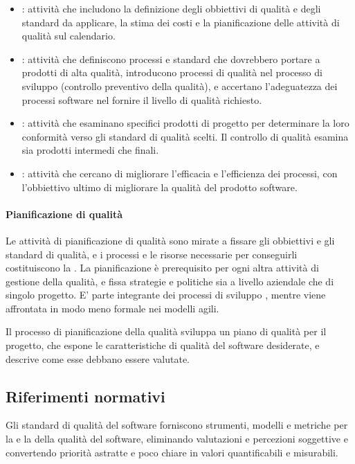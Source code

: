 \begin{itemize}
	\item {}: attività che includono la definizione degli obbiettivi di qualità e degli standard da applicare, la stima dei costi e la pianificazione delle attività di qualità sul calendario.
	\item {}: attività che definiscono processi e standard che dovrebbero portare a prodotti di alta qualità, introducono processi di qualità nel processo di sviluppo (controllo preventivo della qualità), e accertano l'adeguatezza dei processi software nel fornire il livello di qualità richiesto.
	\item {}: attività che esaminano specifici prodotti di progetto per determinare la loro conformità verso gli standard di qualità scelti. Il controllo di qualità esamina sia prodotti intermedi che finali.
	\item {}: attività che cercano di migliorare l'efficacia e l'efficienza dei processi, con l'obbiettivo ultimo di migliorare la qualità del prodotto software.
\end{itemize}

\paragraph{Pianificazione di qualità}
Le attività di pianificazione di qualità sono mirate a fissare gli obbiettivi e gli standard di qualità, e i processi e le risorse necessarie per conseguirli costituiscono la . La pianificazione è prerequisito per ogni altra attività di gestione della qualità, e fissa strategie e politiche sia a livello aziendale che di singolo progetto. E' parte integrante dei processi di sviluppo , mentre viene affrontata in modo meno formale nei modelli agili.

Il processo di pianificazione della qualità sviluppa un piano di qualità per il progetto, che espone le caratteristiche di qualità del software desiderate, e descrive come esse debbano essere valutate.

\subsection{Riferimenti normativi}
Gli standard di qualità del software forniscono strumenti, modelli e metriche per la  e la  della qualità del software, eliminando valutazioni e percezioni soggettive e convertendo priorità astratte e poco chiare in valori quantificabili e misurabili.

